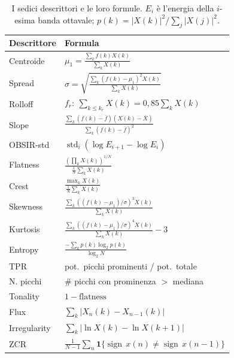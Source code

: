 \documentclass{article}
\begin{document}
\begin{table}[t]
\centering
\footnotesize
\setlength{\tabcolsep}{5pt}
\renewcommand{\arraystretch}{1.2}
\begin{tabular}{@{}ll@{}}
\toprule
\textbf{Descrittore} & \textbf{Formula} \\
\midrule
Centroide & $\mu_1=\frac{\sum_k f(k)X(k)}{\sum_k X(k)}$ \\[7pt]
Spread & $\sigma=\sqrt{\frac{\sum_k (f(k)-\mu_1)^2 X(k)}{\sum_k X(k)}}$ \\[7pt]
Rolloff & $f_r:\ \sum_{k\le k_r}X(k)=0{,}85\sum_k X(k)$ \\[4pt]
Slope & $\frac{\sum_k(f(k)-\bar f)(X(k)-\bar X)}{\sum_k(f(k)-\bar f)^2}$ \\[7pt]
OBSIR-std & $\operatorname{std}_i(\log E_{i+1}-\log E_i)$ \\[2pt]
Flatness & $\frac{(\prod_k X(k))^{1/N}}{\frac{1}{N}\sum_k X(k)}$ \\[8pt]
Crest & $\frac{\max_k X(k)}{\frac{1}{N}\sum_k X(k)}$ \\[8pt]
Skewness & $\frac{\sum_k((f(k)-\mu_1)/\sigma)^3 X(k)}{\sum_k X(k)}$ \\[7pt]
Kurtosis & $\frac{\sum_k((f(k)-\mu_1)/\sigma)^4 X(k)}{\sum_k X(k)}-3$ \\[7pt]
Entropy & $\frac{-\sum_k p(k)\log_2 p(k)}{\log_2 N}$ \\[6pt]
TPR & pot.\ picchi prominenti / pot.\ totale \\[3pt]
N. picchi & \# picchi con prominenza $>$ mediana \\[3pt]
Tonality & $1-\text{flatness}$ \\[2pt]
Flux & $\sum_k |X_n(k)-X_{n-1}(k)|$ \\[4pt]
Irregularity & $\sum_k |\ln X(k)-\ln X(k+1)|$ \\[4pt]
ZCR & $\frac{1}{N-1}\sum_n \mathbf{1}\{\operatorname{sign}\,x(n)\neq\operatorname{sign}\,x(n-1)\}$ \\[2pt]
\bottomrule
\end{tabular}
\caption{I sedici descrittori e le loro formule. $E_i$ è l'energia della $i$-esima banda ottavale; $p(k)=|X(k)|^2/\sum_j|X(j)|^2$.}
\label{tab:descrittori}
\end{table}
\end{document}
